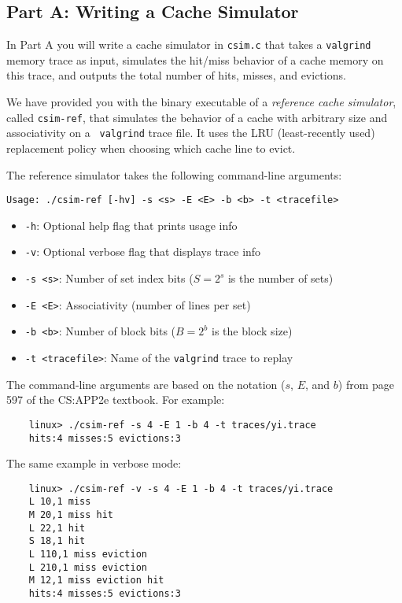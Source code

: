 \documentclass[11pt]{article}
\begin{document}
\subsection{Part A: Writing a Cache Simulator} 

In Part A you will write a cache simulator in {\tt csim.c} that takes
a {\tt valgrind} memory trace as input, simulates the hit/miss
behavior of a cache memory on this trace, and outputs the total number
of hits, misses, and evictions.

We have provided you with the binary executable of a {\em reference
  cache simulator}, called \verb+csim-ref+, that simulates the
behavior of a cache with arbitrary size and associativity on a {\tt
  valgrind} trace file.  It uses the LRU (least-recently used)
replacement policy when choosing which cache line to evict.

The reference simulator takes the following command-line arguments:
\begin{verbatim}
Usage: ./csim-ref [-hv] -s <s> -E <E> -b <b> -t <tracefile>
\end{verbatim}
\begin{itemize}
\item    {\tt -h}: Optional help flag that prints usage info
\item    {\tt -v}: Optional verbose flag that displays trace info
\item     {\tt -s <s>}: Number of set index bits ($S = 2^s$ is the number of sets)
\item    {\tt -E <E>}: Associativity (number of lines per set)
\item     {\tt -b <b>}: Number of block bits ($B = 2^b$ is the block size)
\item     {\tt -t <tracefile>}: Name of the {\tt valgrind} trace to replay
\end{itemize}
The command-line arguments are based on the notation ($s$, $E$, and
$b$) from page 597 of the CS:APP2e textbook. For example:
\begin{verbatim}
    linux> ./csim-ref -s 4 -E 1 -b 4 -t traces/yi.trace
    hits:4 misses:5 evictions:3
\end{verbatim}
The same example in verbose mode:
\begin{verbatim}
    linux> ./csim-ref -v -s 4 -E 1 -b 4 -t traces/yi.trace
    L 10,1 miss 
    M 20,1 miss hit 
    L 22,1 hit 
    S 18,1 hit 
    L 110,1 miss eviction 
    L 210,1 miss eviction 
    M 12,1 miss eviction hit 
    hits:4 misses:5 evictions:3
\end{verbatim}
\end{document}
